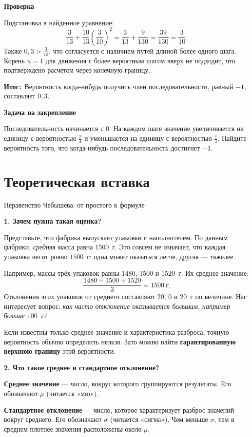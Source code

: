 \documentclass[a4paper,12pt]{article}
\newcommand{\outcome}{\textcolor{deepaccent}{\textbf{Итог:}}\ }
\newcommand{\lab}[1]{\par\noindent\textbf{#1}\par\vspace{-4pt}}
\begin{document}
\lab{Проверка}
Подстановка в найденное уравнение:
\[
\frac3{13}+\frac{10}{13}\left(\frac3{10}\right)^2
=\frac3{13}+\frac9{130}
=\frac{39}{130}=\frac3{10}.
\]
Также $0{,}3>\frac3{13}$, что согласуется с наличием путей длиной более одного шага. Корень $u=1$ для движения с более вероятным шагом вверх не подходит, что подтверждено расчётом через конечную границу.

\outcome Вероятность когда-нибудь получить член последовательности, равный $-1$, составляет $0{,}3$.

\lab{Задача на закрепление}
Последовательность начинается с $0$. На каждом шаге значение увеличивается на единицу с вероятностью $\frac34$ и уменьшается на единицу с вероятностью $\frac14$. Найдите вероятность того, что когда-нибудь последовательность достигнет $-1$.
\newpage

\section*{Теоретическая вставка}
{\large\textcolor{deepaccent}{Неравенство Чебышёва: от простого к формуле}}\par\vspace{2mm}

\lab{1. Зачем нужна такая оценка?}
Представьте, что фабрика выпускает упаковки с наполнителем. По данным фабрики,
\emph{средняя} масса равна $1500$~г. Это совсем не означает, что каждая
упаковка весит ровно $1500$~г: одна может оказаться легче, другая --- тяжелее.

Например, массы трёх упаковок равны $1480$, $1500$ и $1520$~г.
Их среднее значение:
\[
\frac{1480+1500+1520}{3}=1500\ \text{г}.
\]
Отклонения этих упаковок от среднего составляют $20$, $0$ и $20$~г
по величине. Нас интересует вопрос: \emph{как часто отклонение
оказывается большим, например больше $100$~г?}

Если известны только среднее значение и характеристика разброса,
точную вероятность обычно определить нельзя. Зато можно найти
\textbf{гарантированную верхнюю границу} этой вероятности.

\lab{2. Что такое среднее и стандартное отклонение?}
\textbf{Среднее значение} --- число, вокруг которого группируются
результаты. Его обозначают $\mu$ (читается «мю»).

\textbf{Стандартное отклонение} --- число, которое характеризует
разброс значений вокруг среднего. Его обозначают $\sigma$
(читается «сигма»). Чем меньше $\sigma$, тем в среднем плотнее
значения расположены около $\mu$.
\end{document}

